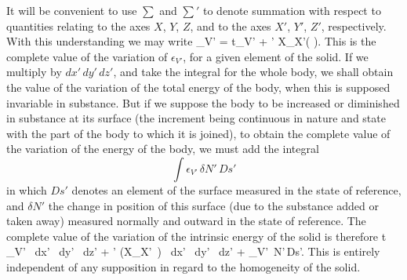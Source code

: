 \documentclass[12pt]{memoir}
\begin{document}
It will be convenient to use $\sum$ and $\sum\nolimits'$ to denote summation with respect to quantities relating to the axes $X$, $Y$, $Z$, and to the axes $X'$, $Y'$, $Z'$, respectively. With this understanding we may write
\eqs \delta \epsilon_{V'} = t\delta \eta_{V'} + \sum \sum\nolimits' X_{X'}\left(\delta {} \right). \label{356}\eqe
This is the complete value of the variation of $\epsilon_{V'}$, for a given element of the solid. If we multiply by $dx'\,dy'\,dz'$, and take the integral for the whole body, we shall obtain the value of the variation of the total energy of the body, when this is supposed invariable in substance. But if we suppose the body to be increased or diminished in substance at its surface (the increment being continuous in nature and state with the part of the body to which it is joined), to obtain the complete value of the variation of the energy of the body, we must add the integral
$$\int \epsilon_{V'}\,\delta N'\,Ds'$$
in which $Ds'$ denotes an element of the surface measured in the state of reference, and $\delta N'$ the change in position of this surface (due to the substance added or taken away) measured normally and outward in the state of reference. The complete value of the variation of the intrinsic energy of the solid is therefore
\eqs \int \int \int t \delta \eta_{V'} \, dx' \, dy' \, dz' + \int \int \int  \sum \sum\nolimits' \left(X_{X'}\, \delta {} \right) \, dx' \, dy' \, dz' + \int \epsilon_{V'} \,\delta N'\,Ds'. \label{357}\eqe
This is entirely independent of any supposition in regard to the homogeneity of the solid.
\end{document}
